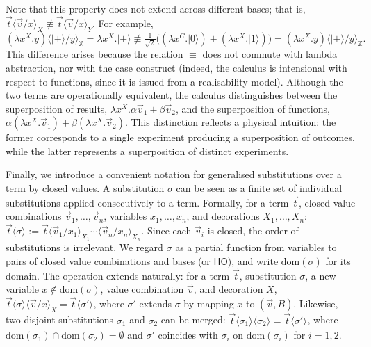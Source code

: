 \documentclass[a4paper,UKenglish,numberwithinsect,pdfa,anonymous]{lipics-v2021}
\theoremstyle{restatestyle}
\newcommand\ket[1]{\ensuremath{|#1\rangle}}
\newcommand\ansubst[2]{\ensuremath{\langle #1 \rangle_{#2}}}
\newcommand\AbsBasis{\ensuremath{\mathsf{H\!O}}}
\newcommand\dom[1]{\mathrm{dom}(#1)}
\def\Lam#1#2#3{\lambda#1^{#2}{.}#3} %
\newcommand\B{\mathbb Z}
\newcommand\XB{\mathbb X}
\begin{document}
Note that this property does not extend across different bases; that is,
$\vec{t}\ansubst{\vec{v}/x}{X} \not\equiv\vec{t}\ansubst{\vec{v}/x}{Y}$.
For example,
\[
  (\Lam{x}{X}{y})\ansubst{\ket{+}/y}{\XB}
  = \Lam{x}{X}{\ket{+}} 
  \not\equiv
  \tfrac{1}{\sqrt{2}}\big((\Lam{x}{C}{\ket{0}})
  + (\Lam{x}{X}{\ket{1}})\big)
  = (\Lam{x}{X}{y})\ansubst{\ket{+}/y}{\B}.
\]
This difference arises because the relation $\equiv$ does not commute with
lambda abstraction, nor with the case construct (indeed, the calculus is
intensional with respect to functions, since it is issued from a realisability
model).  Although the two terms are operationally equivalent, the calculus
distinguishes between the superposition of results, $\Lam{x}{X}{\alpha\vec{v}_{1}
+ \beta\vec{v}_{2}}$, and the superposition of functions,
$\alpha(\Lam{x}{X}{\vec{v}_{1}}) + \beta(\Lam{x}{X}{\vec{v}_{2}})$. 
This distinction reflects a physical intuition: the former corresponds to a
single experiment producing a superposition of outcomes, while the latter
represents a superposition of distinct experiments.

Finally, we introduce a convenient notation for generalised substitutions over
a term by closed values. A substitution $\sigma$ can be seen as a finite set of
individual substitutions applied consecutively to a term. Formally, for a term
$\vec{t}$, closed value combinations $\vec{v}_{1},\dots,\vec{v}_{n}$, variables
$x_1,\dots,x_n$, and decorations $X_1,\dots,X_n$:
\(
  \vec{t}\ansubst{\sigma}{}
  := \vec{t}\ansubst{\vec{v}_{1}/x_1}{X_1}\dotsb\ansubst{\vec{v}_{n}/x_n}{X_n}.
\)
Since each $\vec{v}_{i}$ is closed, the order of substitutions is irrelevant. We
regard $\sigma$ as a partial function from variables to pairs of closed value
combinations and bases (or $\AbsBasis$), and write $\dom{\sigma}$ for its domain.
The operation extends naturally: for a term $\vec{t}$, substitution $\sigma$,
a new variable $x\notin\dom{\sigma}$, value combination $\vec{v}$, and decoration $X$,
\(
  \vec{t}\ansubst{\sigma}{}\ansubst{\vec{v}/x}{X}
  = \vec{t}\ansubst{\sigma'}{}
\),
where $\sigma'$ extends $\sigma$ by mapping $x$ to $(\vec v,B)$. Likewise, two
disjoint substitutions $\sigma_1$ and $\sigma_2$ can be merged:
\(
  \vec{t}\ansubst{\sigma_1}{}\ansubst{\sigma_2}{}
  = \vec{t}\ansubst{\sigma'}{}
\),
where $\dom{\sigma_1}\cap\dom{\sigma_2}=\emptyset$ and $\sigma'$ coincides with
$\sigma_i$ on $\dom{\sigma_i}$ for $i=1,2$.
\end{document}

